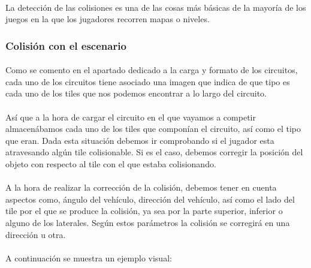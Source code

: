 \documentclass[a4paper,11pt]{article} %
\begin{document}
\paragraph{}
La detección de las colisiones es una de las cosas más básicas de la mayoría de los juegos en la que los jugadores
recorren mapas o niveles.

\subsubsection{Colisión con el escenario}

\paragraph{}
Como se comento en el apartado dedicado a la carga y formato de los circuitos, cada uno de los circuitos tiene asociado una imagen
que indica de que tipo es cada uno de los tiles que nos podemos encontrar a lo largo del circuito.

\paragraph{}
Así que a la hora de cargar el circuito en el que vayamos a competir almacenábamos cada uno de los tiles que componían el circuito,
así como el tipo que eran. Dada esta situación debemos ir comprobando si el jugador esta atravesando algún tile colisionable. 
Si es el caso, debemos corregir la posición del objeto con respecto al tile con el que estaba colisionando.

\paragraph{}
A la hora de realizar la corrección de la colisión, debemos tener en cuenta aspectos como, ángulo del vehículo, dirección del 
vehículo, así como el lado del tile por el que se produce la colisión, ya sea por la parte superior, inferior o alguno 
de los laterales. Según estos parámetros la colisión se corregirá en una dirección u otra.

\paragraph{}
A continuación se muestra un ejemplo visual:
\end{document}
